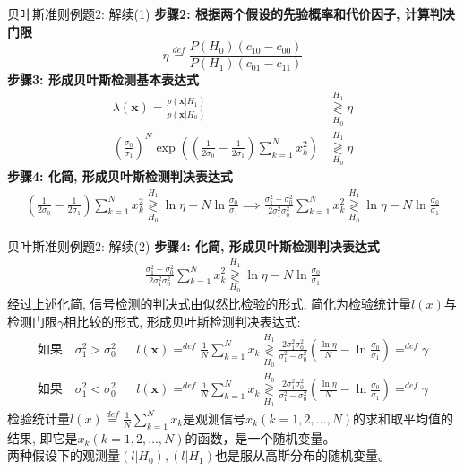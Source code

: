 \begin{frame}[shrink]{贝叶斯准则例题2: 解续(1)}
\textbf{步骤2: 根据两个假设的先验概率和代价因子, 计算判决门限}
\[\eta\mathop{=}\limits^{def}\frac{P(H_0)(c_{10}-c_{00})}{P(H_1)(c_{01}-c_{11})} \]
\textbf{步骤3: 形成贝叶斯检测基本表达式}
\begin{align*}
\lambda(\bm{x})=\frac{p(\bm{x}|H_1)}{p(\bm{x}|H_0)}&\mathop{\gtrless}\limits_{H_0}^{H_1}\eta\\
\left(\frac{\sigma_0}{\sigma_1}\right)^N\exp\left(\left(\frac{1}{2\sigma_0}-\frac{1}{2\sigma_1}\right)\sum\limits_{k=1}^{N}x_k^2\right)&\mathop{\gtrless}\limits_{H_0}^{H_1}\eta
\end{align*} 
\textbf{步骤4: 化简, 形成贝叶斯检测判决表达式}
\begin{align*}
\left(\frac{1}{2\sigma_0}-\frac{1}{2\sigma_1}\right)\sum\limits_{k=1}^{N}x_k^2\mathop{\gtrless}\limits_{H_0}^{H_1}\ln\eta-N\ln\frac{\sigma_0}{\sigma_1}\implies 
\frac{\sigma_1^2-\sigma_0^2}{2\sigma_1^2\sigma_0^2}\sum\limits_{k=1}^{N}x_k^2\mathop{\gtrless}\limits_{H_0}^{H_1}\ln\eta-N\ln\frac{\sigma_0}{\sigma_1}
\end{align*} 
\end{frame}

\begin{frame}[shrink]{贝叶斯准则例题2: 解续(2)}
\textbf{步骤4: 化简, 形成贝叶斯检测判决表达式}
\begin{align*}
\frac{\sigma_1^2-\sigma_0^2}{2\sigma_1^2\sigma_0^2}\sum\limits_{k=1}^{N}x_k^2\mathop{\gtrless}\limits_{H_0}^{H_1}\ln\eta-N\ln\frac{\sigma_0}{\sigma_1}
\end{align*}
经过上述化简, 信号检测的判决式由似然比检验的形式, 简化为检验统计量$l(x)$与检测门限$\gamma$相比较的形式, 形成贝叶斯检测判决表达式:
\begin{align*}
\textbf{如果}\quad\sigma_1^2>\sigma_0^2 &&l(\bm{x})\mathop{=}^{def}\frac{1}{N}\sum\limits_{k=1}^{N}x_k\mathop{\gtrless}\limits_{H_0}^{H_1}\frac{2\sigma_1^2\sigma_0^2}{\sigma_1^2-\sigma_0^2}(\frac{\ln\eta}{N}-\ln\frac{\sigma_0}{\sigma_1})\mathop{=}^{def}\gamma\\
\textbf{如果}\quad\sigma_1^2<\sigma_0^2 &&l(\bm{x})\mathop{=}^{def}\frac{1}{N}\sum\limits_{k=1}^{N}x_k\mathop{\gtrless}\limits_{H_1}^{H_0}\frac{2\sigma_1^2\sigma_0^2}{\sigma_1^2-\sigma_0^2}(\frac{\ln\eta}{N}-\ln\frac{\sigma_0}{\sigma_1})\mathop{=}^{def}\gamma
\end{align*}
检验统计量$l(x)\mathop{=}\limits^{def}\frac{1}{N}\sum\limits_{k=1}^Nx_k$是观测信号$x_k(k=1,2,\dots,N)$的求和取平均值的结果, 即它是$x_k(k=1,2,\dots,N)$的函数，是一个随机变量。\\
两种假设下的观测量$(l|H_0),(l|H_1)$也是服从高斯分布的随机变量。 
\end{frame}

